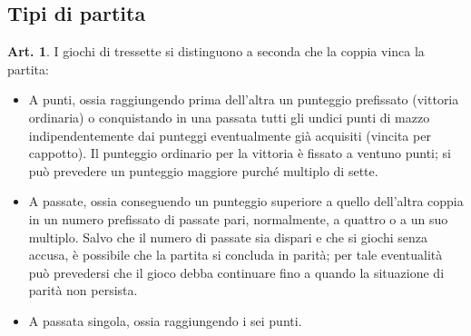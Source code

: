 \documentclass[italian,a4paper]{book}
\theoremstyle{definition}
\newtheorem{art}{Art.}
\newenvironment{packeditem}{
\begin{itemize}
  \setlength{\itemsep}{1pt}
  \setlength{\parskip}{0pt}
  \setlength{\parsep}{0pt}
}{\end{itemize}}
\begin{document}
\subsection{Tipi di partita}
\begin{art}
I giochi di tressette si distinguono a seconda che la coppia vinca la partita:
\begin{packeditem}
\item      A punti, ossia raggiungendo prima dell'altra un punteggio prefissato (vittoria ordinaria) o conquistando in una passata tutti gli undici punti di mazzo indipendentemente dai punteggi eventualmente già acquisiti (vincita per cappotto). Il punteggio ordinario per la vittoria è fissato a ventuno punti; si può prevedere un punteggio maggiore purché multiplo di sette.
\item     A passate, ossia conseguendo un punteggio superiore a quello dell'altra coppia in un numero prefissato di passate pari, normalmente, a quattro o a un suo multiplo. Salvo che il numero di passate sia dispari e che si giochi senza accusa, è possibile che la partita si concluda in parità; per tale eventualità può prevedersi che il gioco debba continuare fino a quando la situazione di parità non persista.
\item     A passata singola, ossia raggiungendo i sei punti.
    \end{packeditem}
\end{art}
\end{document}
